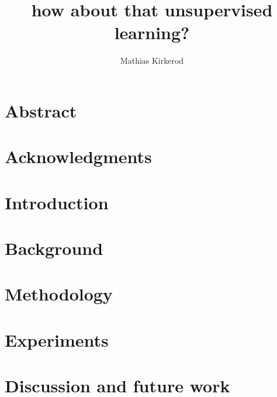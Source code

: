 \documentclass[a4paper,english,twoside,11pt]{ifimaster}
\title{how about that unsupervised learning?}
\author{Mathias Kirkerod}
\begin{document}
\setcounter{hyp}{-1}
\duoforside[dept={Department of Informatics},program={Informatics: Technical and Scientific Applications},long]

\frontmatter{}
\chapter*{Abstract}


\chapter*{Acknowledgments}


\tableofcontents{}
\listoffigures{}
\listoftables{}


\mainmatter{}


\chapter{Introduction} \label{cap:introduction}


\chapter{Background} \label{cap:background}



\chapter{Methodology}\label{cap:methodology}



%

\chapter{Experiments} \label{cap:experiments}



\chapter{Discussion and future work} \label{cap:future}

\end{document}
